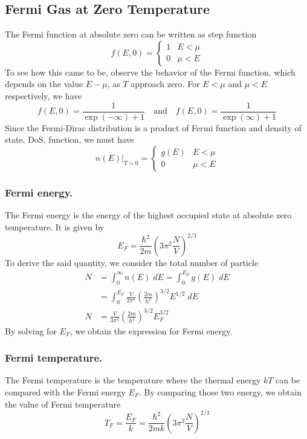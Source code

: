 \documentclass[../../../Main.tex]{subfiles}
\begin{document}
\subsection*{Fermi Gas at Zero Temperature}
The Fermi function at absolute zero can be written as step function
\begin{equation*}
    f(E,0)=\begin{cases}
        1&E<\mu\\
        0&\mu<E
    \end{cases}
\end{equation*}
To see how this came to be, observe the behavior of the Fermi function, which depends on the value $E-\mu$, as $T$ approach zero. For $E<\mu$ and $\mu<E$ respectively, we have
\begin{equation*}
    f(E,0)=\frac{1}{\exp (-\infty)+1}\quad\text{and}\quad f(E,0)=\frac{1}{\exp(\infty)+1}
\end{equation*}
Since the Fermi-Dirac distribution is a product of Fermi function and density of state, DoS, function, we must have 
\begin{equation*}
    n(E)\big|_{T=0}=\begin{cases}
        g(E)&E<\mu\\
        0&\mu<E
    \end{cases}
\end{equation*}

\subsubsection*{Fermi energy.} The Fermi energy is the energy of the highest occupied state at absolute zero temperature. It is given by
\begin{equation*}
    E_F=\frac{\hbar^2}{2m}\left(3\pi^2\frac{N}{V}\right)^{2/3}
\end{equation*}
To derive the said quantity, we consider the total number of particle
\begin{align*}
    N&=\int_{0}^{\infty}n(E)\;dE=\int_{0}^{E_F}g(E)\;dE\\
    &=\int_{0}^{E_F} \frac{V}{2\pi^2}\left(\frac{2m}{\hbar^2}\right)^{3/2}E^{1/2}\;dE\\
    N&=\frac{V}{3\pi^2}\left(\frac{2m}{\hbar^2}\right)^{3/2}E_F^{3/2}
\end{align*}
By solving for $E_F$, we obtain the expression for Fermi energy.

\subsubsection*{Fermi temperature.} The Fermi temperature is the temperature where the thermal energy $kT$ can be compared with the Fermi energy $E_F$. By comparing those two energy, we obtain the value of Fermi temperature
\begin{equation*}
    T_F=\frac{E_F}{k}=\frac{\hbar^2}{2mk}\left(3\pi^2\frac{N}{V}\right)^{2/3}
\end{equation*}
\end{document}

